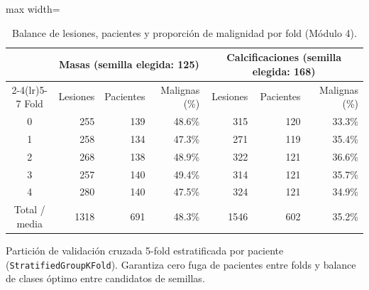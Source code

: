 \begin{table}[H]
\centering
\small
\caption{Balance de lesiones, pacientes y proporción de malignidad por fold (Módulo 4).}
\label{tab:anexo_m4_folds}
\begin{adjustbox}{max width=\linewidth}
\begin{tabular}{c r r r r r r}
\toprule
 & \multicolumn{3}{c}{Masas (semilla elegida: 125)} & \multicolumn{3}{c}{Calcificaciones (semilla elegida: 168)} \\ \cmidrule(lr){2-4}\cmidrule(lr){5-7}
Fold & Lesiones & Pacientes & Malignas (\%) & Lesiones & Pacientes & Malignas (\%) \\
\midrule
0 & 255 & 139 & 48.6\% & 315 & 120 & 33.3\% \\
1 & 258 & 134 & 47.3\% & 271 & 119 & 35.4\% \\
2 & 268 & 138 & 48.9\% & 322 & 121 & 36.6\% \\
3 & 257 & 140 & 49.4\% & 314 & 121 & 35.7\% \\
4 & 280 & 140 & 47.5\% & 324 & 121 & 34.9\% \\
\midrule
Total / media & 1318 & 691 & 48.3\% & 1546 & 602 & 35.2\% \\
\bottomrule
\end{tabular}
\end{adjustbox}
\par\smallskip
\parbox{0.95\linewidth}{\footnotesize Partición de validación cruzada 5-fold estratificada por paciente (\texttt{StratifiedGroupKFold}). Garantiza cero fuga de pacientes entre folds y balance de clases óptimo entre candidatos de semillas.}
\end{table}
